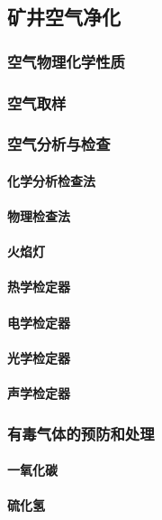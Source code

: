 \documentclass[UTF8]{../../ApplicationUniverse}
\begin{document}
    \subsection{矿井空气净化}
        \subsubsection{空气物理化学性质}
        \subsubsection{空气取样}
        \subsubsection{空气分析与检查}
            \paragraph{化学分析检查法}
            \paragraph{物理检查法}
            \paragraph{火焰灯}
            \paragraph{热学检定器}
            \paragraph{电学检定器}
            \paragraph{光学检定器}
            \paragraph{声学检定器}
        \subsubsection{有毒气体的预防和处理}
            \paragraph{一氧化碳}
            \paragraph{硫化氢}
\end{document}
